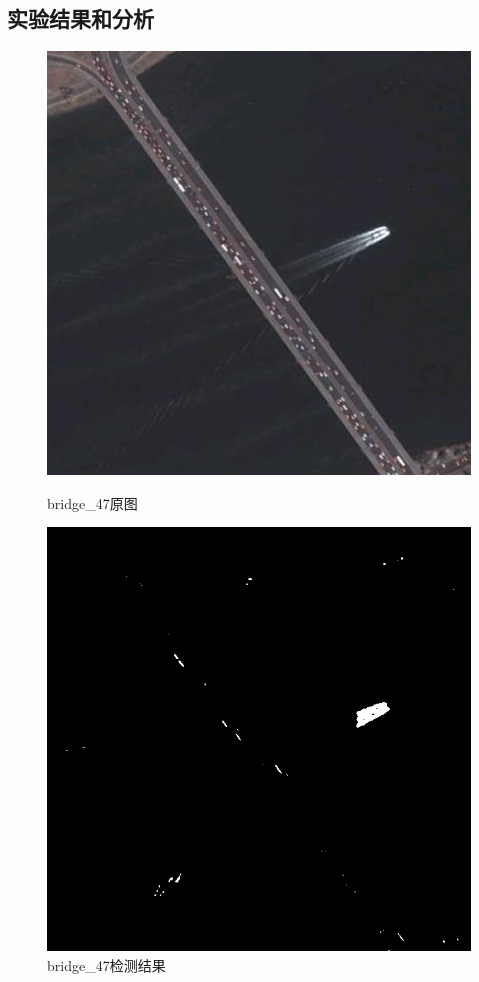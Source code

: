 \subsection{实验结果和分析}
\begin{figure}[H]
	\centering
	\begin{minipage}{0.45\linewidth}
		\includegraphics[width=\linewidth]{figure/bridge_47.jpg}
		\caption{bridge\_47原图}
	\end{minipage}
	\begin{minipage}{0.45\linewidth}
		\includegraphics[width=\linewidth]{figure/bridge_47_detection.png}
		\caption{bridge\_47检测结果}
	\end{minipage}
\end{figure}
